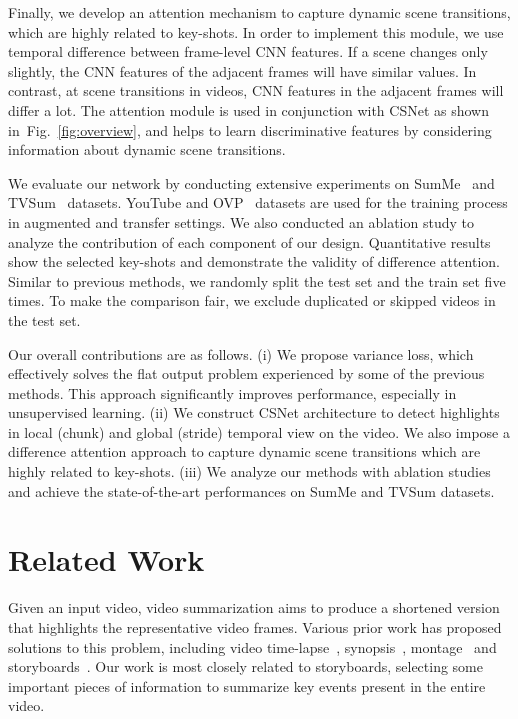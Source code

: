 \documentclass[letterpaper]{article} \usepackage{aaai19}  \usepackage{times}  \usepackage{helvet}  \usepackage{courier}  \usepackage{url}  \usepackage{graphicx}  \frenchspacing  \setlength{\pdfpagewidth}{8.5in}  \setlength{\pdfpageheight}{11in}
\newcommand{\figref}[1]{Fig.~\ref{#1}}
\begin{document}
Finally, we develop an attention mechanism to capture dynamic scene transitions, which are highly related to key-shots. In order to implement this module, we use temporal difference between frame-level CNN features. If a scene changes only slightly, the CNN features of the adjacent frames will have similar values. In contrast, at scene transitions in videos, CNN features in the adjacent frames will differ a lot. The attention module is used in conjunction with CSNet as shown in~\figref{fig:overview}, and helps to learn discriminative features by considering information about dynamic scene transitions.










We evaluate our network by conducting extensive experiments on SumMe~\cite{gygli2014creating} and TVSum~\cite{song2015tvsum} datasets. YouTube and OVP~\cite{de2011vsumm} datasets are used for the training process in augmented and transfer settings. We also conducted an ablation study to analyze the contribution of each component of our design. Quantitative results show the selected key-shots and demonstrate the validity of difference attention. Similar to previous methods, we randomly split the test set and the train set five times. To make the comparison fair, we exclude duplicated or skipped videos in the test set.

Our overall contributions are as follows. (i) We propose variance loss, which effectively solves the flat output problem experienced by some of the previous methods. This approach significantly improves performance, especially in unsupervised learning. (ii) We construct CSNet architecture to detect highlights in local (chunk) and global (stride) temporal view on the video. We also impose a difference attention approach to capture dynamic scene transitions which are highly related to key-shots. (iii) We analyze our methods with ablation studies and achieve the state-of-the-art performances on SumMe and TVSum datasets.



\section{Related Work}


Given an input video, video summarization aims to produce a shortened version
that highlights the representative video frames. Various
prior work has proposed solutions to this problem, including video time-lapse~\cite{joshi2015real,kopf2014first,poleg2015egosampling}, synopsis~\cite{pritch2008nonchronological}, montage~\cite{kang2006space,sun2014salient} and storyboards~\cite{gong2014diverse,gygli2014creating,gygli2015video,lee2012discovering,liu2010hierarchical,yang2015unsupervised,gong2014diverse}. Our work is most closely related to storyboards, selecting some important pieces of information to summarize key events present in the entire video.
\end{document}

